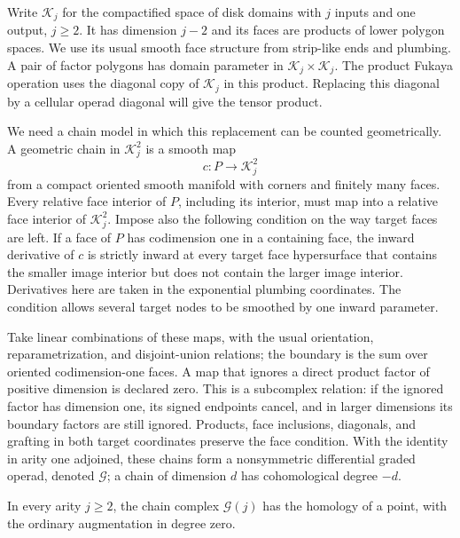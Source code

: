 Write $\mathcal K_j$ for the compactified space of disk domains with $j$
inputs and one output, $j\geq2$.  It has dimension $j-2$ and its
faces are products of lower polygon spaces.  We use its usual
smooth face structure from strip-like ends and plumbing.  A pair
of factor polygons has domain parameter in $\mathcal K_j\times \mathcal K_j$.
The product Fukaya operation uses the diagonal copy of $\mathcal K_j$ in
this product.  Replacing this diagonal by a cellular operad
diagonal will give the tensor product.

We need a chain model in which this replacement can be counted
geometrically.  A geometric chain in $\mathcal K_j^2$ is a smooth map
\[
 c:P\longrightarrow \mathcal K_j^2
\]
from a compact oriented smooth manifold with corners and finitely
many faces.  Every relative face interior of $P$, including its
interior, must map into a relative face interior of $\mathcal K_j^2$.
Impose also the following condition on the way target faces are
left.  If a face of $P$ has codimension one in a containing face,
the inward derivative of $c$ is strictly inward at every target
face hypersurface that contains the smaller image interior but
does not contain the larger image interior.  Derivatives here are
taken in the exponential plumbing coordinates.  The condition
allows several target nodes to be smoothed by one inward
parameter.

Take linear combinations of these maps, with the usual orientation,
reparametrization, and disjoint-union relations; the boundary is
the sum over oriented codimension-one faces.  A map that ignores
a direct product factor of positive dimension is declared zero.
This is a subcomplex relation: if the ignored factor has dimension
one, its signed endpoints cancel, and in larger dimensions its
boundary factors are still ignored.  Products, face inclusions,
diagonals, and grafting in both target coordinates preserve the
face condition.  With the identity in arity one adjoined, these
chains form a nonsymmetric differential graded operad, denoted
$\mathcal G$; a chain of dimension $d$ has cohomological degree
$-d$.

\begin{lemma}
\label{comp:chain-acyclic}
In every arity $j\geq2$, the chain complex $\mathcal G(j)$ has the
homology of a point, with the ordinary augmentation in degree zero.
\end{lemma}

